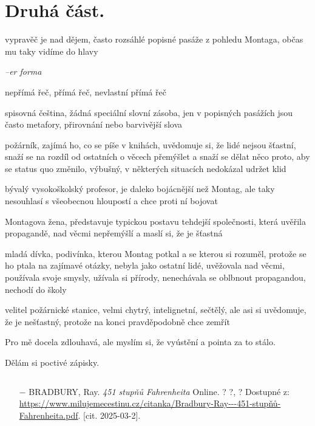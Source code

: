 \documentclass{article}
\begin{document}
\section{Druhá část.}
\begin{description}
    \setlength\itemsep{0.15em}
    \item[vypravěč:] vypravěč je nad dějem, často rozsáhlé popisné pasáže z pohledu Montaga, občas mu taky vidíme do hlavy
    \item[vyprávěcí způsoby:] \textit{--er forma}
    \item[typy promluv:] nepřímá řeč, přímá řeč, nevlastní přímá řeč
    \item[jazyková stránka:] spisovná čeština, žádná speciální slovní zásoba, jen v popisných pasážích jsou často metafory, přirovnání nebo barvivější slova
    \item[postavy:]
        \begin{description}
            \setlength\itemsep{0.15em}
      		\item[Guy Montag,] požárník, zajímá ho, co se píše v knihách, uvědomuje si, že lidé nejsou šťastní, snaží se na rozdíl od ostatních o věcech přemýšlet a snaží se dělat něco proto, aby se status quo změnilo, výbušný, v některých situacích nedokázal udržet klid
       	  \item[Faber,] bývalý vysokoškolský profesor, je daleko bojácnější než Montag, ale taky nesouhlasí s všeobecnou hloupostí a chce proti ní bojovat
         	\item[Mildred,] Montagova žena, představuje typickou postavu tehdejší společnosti, která uvěřila propagandě, nad věcmi nepřemýšlí a maslí si, že je šťastná
         	\item[Clarissa McClellanová,] mladá dívka, podivínka, kterou Montag potkal a se kterou si rozuměl, protože se ho ptala na zajímavé otázky, nebyla jako ostatní lidé, uvěžovala nad věcmi, používala svoje smysly, užívala si přírody, nenechávala se oblbnout propagandou, nechodí do školy
         	\item[Beatty,] velitel požárnické stanice, velmi chytrý, intelignetní, sečtělý, ale asi si uvědomuje, že je nešťastný, protože na konci pravděpodobně chce zemřít
        \end{description}
    \item[názor:] Pro mě docela zdlouhavá, ale myslím si, že vyústění a pointa za to stálo.
    \item[kontext:]  Dělám si poctivé zápisky.
    \item[zdroje:] $ $
    \begin{itemize}
        \setlength\itemsep{0em}
        \item[$-$] BRADBURY, Ray. \textit{451 stupňů Fahrenheita} Online. ? ?, ? Dostupné z: \url{https://www.milujemecestinu.cz/citanka/Bradbury-Ray---451-stupňů-Fahrenheita.pdf}. [cit. 2025-03-2].
    \end{itemize}
\end{description}
\end{document}

